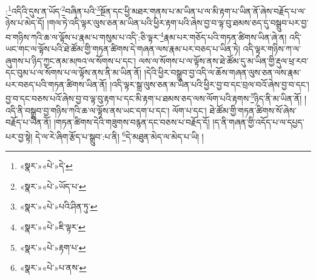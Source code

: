 :\footnote{«སྣར་»«པེ་»དེ་}འདིའི་དུས་ན་ཡོད་\footnote{«སྣར་»«པེ་»ཡོད་པ་}བཞིན་པའི་\footnote{«སྣར་»«པེ་»པའི་ཤིན་ཏུ་}སྔོན་དང་ཕྱི་མཐར་གནས་པ་མ་ཡིན་པ་ལ་མི་རྟག་པ་ཡིན་ནོ་ཞེས་བརྗོད་པ་ལ་ཉེས་པ་མེད་དོ། །གལ་ཏེ་འདི་ལྟར་ལུས་ཅན་མ་ཡིན་པའི་ཕྱིར་རྟག་པའི་ཞེས་བྱ་བ་ལྟ་བུ་ཐམས་ཅད་དུ་བསྒྲུབ་པར་བྱ་བ་གཉིས་ཀའི་ཆ་ལ་ལྟོས་པ་རྣམ་པ་གསུམ་པ་འདི་:ཅི་ལྟར་\footnote{«སྣར་»«པེ་»ཇི་ལྟར་}རྣམ་པར་གཅོད་པའི་གཏན་ཚིགས་ཡིན་ཞེ་ན། འདི་ཡང་གང་ལ་ལྟོས་པའི་ཐེ་ཚོམ་གྱི་གཏན་ཚིགས་དེ་གཞན་ལས་རྣམ་པར་བཅད་པ་ཡིན་ཏེ། འདི་ལྟར་གཉིས་ཀ་ལ་ཞུགས་པ་ཉིད་ཀྱང་ནམ་མཁའ་ལ་སོགས་པ་དང་། ལས་ལ་སོགས་པ་ལ་ལྟོས་ནས་ཐེ་ཚོམ་དུ་མ་ཡིན་གྱི་རྡུལ་ཕྲ་རབ་དང་བུམ་པ་ལ་སོགས་པ་ལ་ལྟོས་ནས་ནི་མ་ཡིན་ནོ། །དེའི་ཕྱིར་བསྒྲུབ་བྱ་འདི་ལ་ཆོས་གཞན་ལུས་ཅན་ལས་རྣམ་པར་བཅད་པའི་གཏན་ཚིགས་ཡིན་ནོ། །འདི་ལྟར་སྒྲ་ལུས་ཅན་མ་ཡིན་པའི་ཕྱིར་བྱ་བ་དང་བྲལ་བའོ་ཞེས་བྱ་བ་དང་། བྱ་བ་དང་བཅས་པའོ་ཞེས་བྱ་བ་ལྟ་བུ་རྟག་པ་དང་མི་རྟག་པ་ཐམས་ཅད་ལས་ལོག་པའི་རྟགས་\footnote{«སྣར་»«པེ་»རྟག་པ་}ཉིད་ནི་མ་ཡིན་ནོ། །འདི་ནི་བསྒྲུབ་བྱ་གཉིས་ཀའི་ཆ་ལ་ལྟོས་ནས་ཡང་དག་པ་དང་། ལོག་པ་དང་། ཐེ་ཚོམ་གྱི་གཏན་ཚིགས་སོ་ཞེས་བརྗོད་པ་ཡིན་ནོ། །གཏན་ཚིགས་དེའི་གཟུགས་བརྙན་དང་བཅས་པ་བརྗོད་དོ། །ད་ནི་གཞན་གྱི་འདོད་པ་ལ་དཔྱད་པར་བྱ་སྟེ། དེ་ལ་རེ་ཞིག་རྩོད་པ་སྒྲུབ་:པ་ནི། \footnote{«སྣར་»«པེ་»པ་ནས་}དེ་མཐུན་མེད་ལ་མེད་པ་ཡི། །

